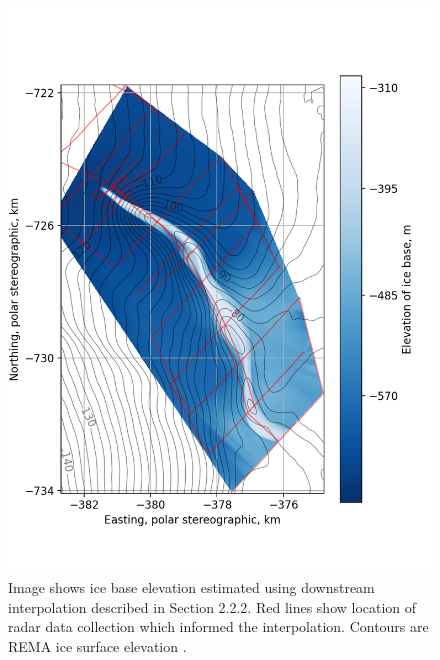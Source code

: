 \begin{figure}[h!]
\includegraphics[width=1\textwidth]{chapters/2/ice_base_solo.png}
 \caption[]{Image shows ice base elevation estimated using downstream interpolation described in Section 2.2.2. Red lines show location of radar data collection which informed the interpolation. Contours are REMA ice surface elevation \cite{howat2019reference}.
}
\label{fig:ice_base_solo}
\end{figure}
%
